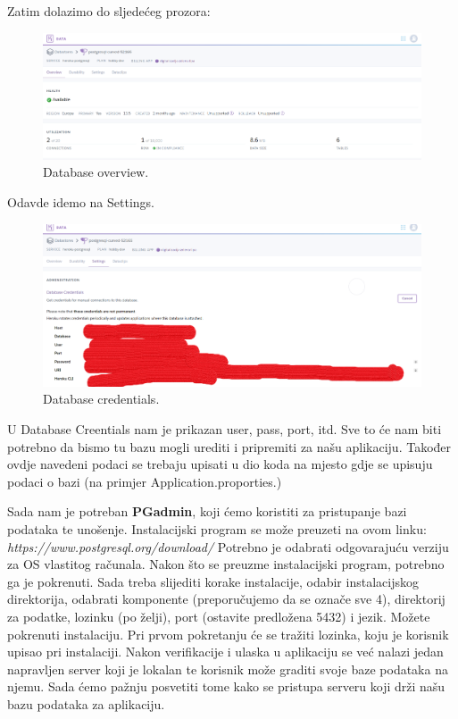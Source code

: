 		 Zatim dolazimo do sljedećeg prozora:
			 
			 \begin{figure}[H]
			 	\includegraphics[scale=0.4]{slike/Datastores.png} 
			 	\centering
			 	\caption{ Database overview.}
			 	\label{DO}
			 \end{figure}
		 
		 	Odavde idemo na Settings.
		 	
		 	
		 	\begin{figure}[H]
		 		\includegraphics[scale=0.3]{slike/Datacredentials.png} 
		 		\centering
		 		\caption{ Database credentials.}
		 		\label{DBC}
		 	\end{figure}
			 
			 U Database Creentials nam je prikazan user, pass, port, itd. Sve to će nam biti potrebno da bismo tu bazu mogli urediti i pripremiti za našu aplikaciju. Također ovdje navedeni podaci se trebaju upisati u dio koda na mjesto gdje se upisuju podaci o bazi (na primjer Application.proporties.)
			 
			 Sada nam je potreban \textbf{PGadmin}, koji ćemo koristiti za pristupanje bazi podataka te unošenje. Instalacijski program se može preuzeti na ovom linku: \textit{https://www.postgresql.org/download/} Potrebno je odabrati odgovarajuću verziju za OS vlastitog računala. Nakon što se preuzme instalacijski program, potrebno ga je pokrenuti. Sada treba slijediti korake instalacije, odabir instalacijskog direktorija, odabrati komponente (preporučujemo da se označe sve 4), direktorij za podatke, lozinku (po želji), port (ostavite predložena 5432) i jezik. Možete pokrenuti instalaciju. Pri prvom pokretanju će se tražiti lozinka, koju je korisnik upisao pri instalaciji. Nakon verifikacije i ulaska u aplikaciju se već nalazi jedan napravljen server koji je lokalan te korisnik može graditi svoje baze podataka na njemu. Sada ćemo pažnju posvetiti tome kako se pristupa serveru koji drži našu bazu podataka za aplikaciju.
			 
